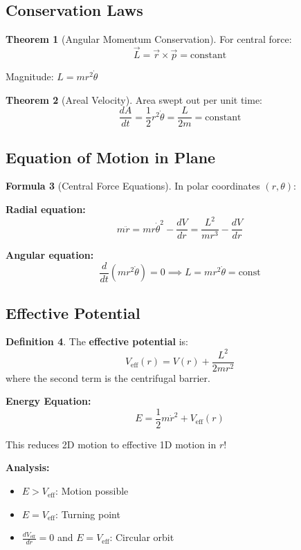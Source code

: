 \documentclass[12pt,a4paper]{article}
\theoremstyle{definition}
\newtheorem{theorem}{Theorem}[section]
\newtheorem{definition}[theorem]{Definition}
\newtheorem{formula}[theorem]{Formula}
\begin{document}
\subsection{Conservation Laws}

\begin{theorem}[Angular Momentum Conservation]
For central force:
\[
\vec{L} = \vec{r} \times \vec{p} = \text{constant}
\]

Magnitude: $L = mr^2\dot{\theta}$
\end{theorem}

\begin{theorem}[Areal Velocity]
Area swept out per unit time:
\[
\frac{dA}{dt} = \frac{1}{2}r^2\dot{\theta} = \frac{L}{2m} = \text{constant}
\]
\end{theorem}

\subsection{Equation of Motion in Plane}

\begin{formula}[Central Force Equations]
In polar coordinates $(r, \theta)$:

\textbf{Radial equation:}
\[
m\ddot{r} = mr\dot{\theta}^2 - \frac{dV}{dr} = \frac{L^2}{mr^3} - \frac{dV}{dr}
\]

\textbf{Angular equation:}
\[
\frac{d}{dt}(mr^2\dot{\theta}) = 0 \implies L = mr^2\dot{\theta} = \text{const}
\]
\end{formula}

\subsection{Effective Potential}

\begin{definition}
The \textbf{effective potential} is:
\[
V_{\text{eff}}(r) = V(r) + \frac{L^2}{2mr^2}
\]
where the second term is the centrifugal barrier.
\end{definition}

\begin{importantbox}
\textbf{Energy Equation:}
\[
E = \frac{1}{2}m\dot{r}^2 + V_{\text{eff}}(r)
\]

This reduces 2D motion to effective 1D motion in $r$!

\textbf{Analysis:}
\begin{itemize}
    \item $E > V_{\text{eff}}$: Motion possible
    \item $E = V_{\text{eff}}$: Turning point
    \item $\frac{dV_{\text{eff}}}{dr} = 0$ and $E = V_{\text{eff}}$: Circular orbit
\end{itemize}
\end{importantbox}
\end{document}

